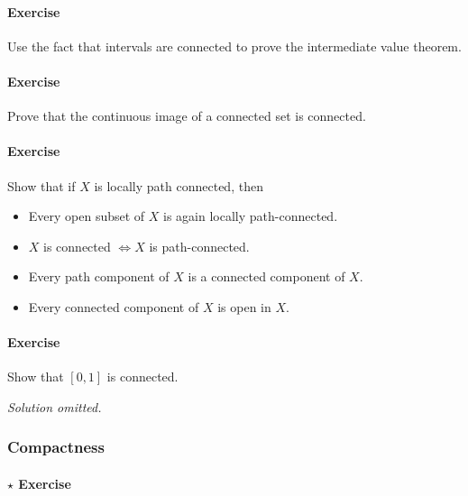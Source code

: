 \hypertarget{exercise-9}{%
\paragraph{Exercise}\label{exercise-9}}

Use the fact that intervals are connected to prove the intermediate
value theorem.

\hypertarget{exercise-10}{%
\paragraph{Exercise}\label{exercise-10}}

Prove that the continuous image of a connected set is connected.

\hypertarget{exercise-11}{%
\paragraph{Exercise}\label{exercise-11}}

Show that if \(X\) is locally path connected, then

\begin{itemize}
\tightlist
\item
  Every open subset of \(X\) is again locally path-connected.
\item
  \(X\) is connected \(\iff X\) is path-connected.
\item
  Every path component of \(X\) is a connected component of \(X\).
\item
  Every connected component of \(X\) is open in \(X\).
\end{itemize}

\hypertarget{exercise-12}{%
\paragraph{Exercise}\label{exercise-12}}

Show that \([0, 1]\) is connected.

\emph{Solution omitted.}

\hypertarget{compactness}{%
\subsubsection{Compactness}\label{compactness}}

\hypertarget{star-exercise}{%
\paragraph{\texorpdfstring{\(\star\)
Exercise}{\textbackslash star Exercise}}\label{star-exercise}}

